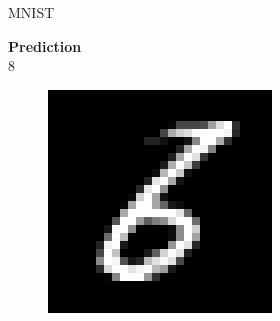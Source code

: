 \documentclass{beamer}
\begin{document}
\begin{frame}{MNIST}
\begin{minipage}[t]{0.32\columnwidth}
{\begin{minipage}[t]{0.57\columnwidth}
				\centering
				\textbf{Prediction}\\
				\LARGE{8}
		\end{minipage}}
		\begin{figure}
			\includegraphics[width=1\columnwidth]{pres_pics/low_conf/68}
		\end{figure}
	\end{minipage}
\hfill
	\begin{minipage}[t]{0.32\columnwidth}
		\begin{figure}

\end{figure}
\end{minipage}
\end{frame}
\end{document}

